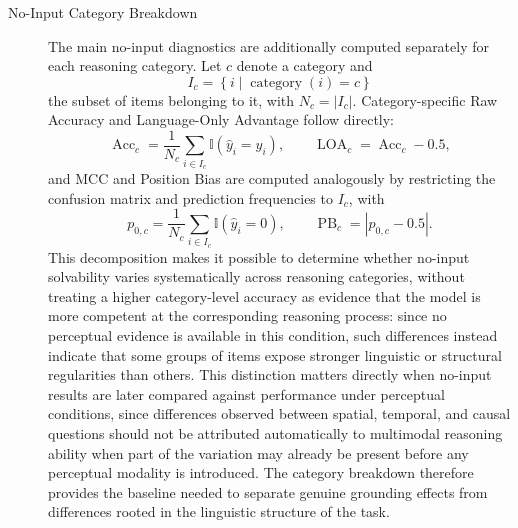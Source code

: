 \begin{description}
\item[No-Input Category Breakdown] The main no-input diagnostics are additionally computed separately for each reasoning category. Let \(c\) denote a category and
\begin{equation}
I_c = \left\{i \mid \operatorname{category}(i)=c\right\}
\end{equation}
the subset of items belonging to it, with \(N_c = |I_c|\). Category-specific Raw Accuracy and Language-Only Advantage follow directly:
\begin{equation}
\operatorname{Acc}_{c} = \frac{1}{N_c} \sum_{i \in I_c} \mathbb{I} \left(\hat{y}_i = y_i\right), \qquad \operatorname{LOA}_{c} = \operatorname{Acc}_{c} - 0.5,
\end{equation}
and MCC and Position Bias are computed analogously by restricting the confusion matrix and prediction frequencies to \(I_c\), with
\begin{equation}
p_{0,c} = \frac{1}{N_c} \sum_{i \in I_c} \mathbb{I} \left(\hat{y}_i=0\right), \qquad \operatorname{PB}_{c} = \left|p_{0,c}-0.5\right|.
\end{equation}
This decomposition makes it possible to determine whether no-input solvability varies systematically across reasoning categories, without treating a higher category-level accuracy as evidence that the model is more competent at the corresponding reasoning process: since no perceptual evidence is available in this condition, such differences instead indicate that some groups of items expose stronger linguistic or structural regularities than others. This distinction matters directly when no-input results are later compared against performance under perceptual conditions, since differences observed between spatial, temporal, and causal questions should not be attributed automatically to multimodal reasoning ability when part of the variation may already be present before any perceptual modality is introduced. The category breakdown therefore provides the baseline needed to separate genuine grounding effects from differences rooted in the linguistic structure of the task.
\end{description}
